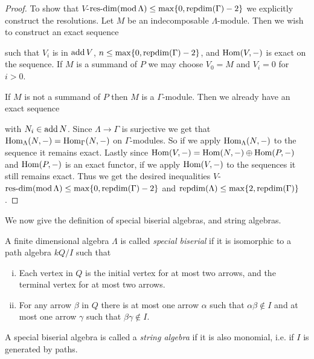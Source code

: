 \begin{theorem}
\begin{proof}
		To show that $V$-$\operatorname{res-dim}(\operatorname{mod} \Lambda) \leq \max\{0, \operatorname{repdim}(\Gamma)-2\}$ we explicitly construct the resolutions. Let $M$ be an indecomposable $\Lambda$-module. Then we wish to construct an exact sequence
		\begin{center}
		\end{center} 
		such that $V_i$ is in $\operatorname{add} V$, $n\leq \max\{0, \operatorname{repdim}(\Gamma)-2\}$, and $\operatorname{Hom}(V, -)$ is exact on the sequence. If $M$ is a summand of $P$ we may choose $V_0=M$ and $V_i=0$ for $i>0$.
		
		If $M$ is not a summand of $P$ then $M$ is a $\Gamma$-module. Then we already have an exact sequence
		\begin{center}
		\end{center} 
		with $N_i \in \operatorname{add} N$. Since $\Lambda \to \Gamma$ is surjective we get that $\operatorname{Hom}_\Lambda(N, -)=\operatorname{Hom}_\Gamma(N,-)$ on $\Gamma$-modules. So if we apply $\operatorname{Hom}_\Lambda(N, -)$ to the sequence it remains exact. Lastly since $\operatorname{Hom}(V,-) = \operatorname{Hom}(N, -) \oplus \operatorname{Hom}(P, -)$ and $\operatorname{Hom}(P, -)$ is an exact functor, if we apply $\operatorname{Hom}(V, -)$ to the sequences it still remains exact. Thus we get the desired inequalities $V$-$\operatorname{res-dim}(\operatorname{mod} \Lambda) \leq \max\{0, \operatorname{repdim}(\Gamma)-2\}$ and $\operatorname{repdim}(\Lambda) \leq \max\{2, \operatorname{repdim}(\Gamma)\}$. 
	\end{proof}
\end{theorem}

We now give the definition of special biserial algebras, and string algebras.

\begin{defn}
	A finite dimensional algebra $\Lambda$ is called \emph{special biserial} if it is isomorphic to a path algebra $kQ/I$ such that
	\begin{enumerate}[i)]
		\item Each vertex in $Q$ is the initial vertex for at most two arrows, and the terminal vertex for at most two arrows.
		\item For any arrow $\beta$ in $Q$ there is at most one arrow $\alpha$ such that $\alpha\beta \not\in I$ and at most one arrow $\gamma$ such that $\beta\gamma \not\in I$.
	\end{enumerate}
	A special biserial algebra is called a \emph{string algebra} if it is also monomial, i.e. if $I$ is generated by paths. 
\end{defn}


